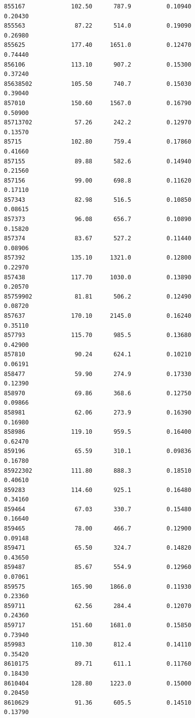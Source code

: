 \documentclass[
  letterpaper,
  DIV=11,
  numbers=noendperiod]{scrartcl}
\begin{document}
\begin{verbatim}
855167             102.50      787.9          0.10940           0.20430
855563              87.22      514.0          0.19090           0.26980
855625             177.40     1651.0          0.12470           0.74440
856106             113.10      907.2          0.15300           0.37240
85638502           105.50      740.7          0.15030           0.39040
857010             150.60     1567.0          0.16790           0.50900
85713702            57.26      242.2          0.12970           0.13570
85715              102.80      759.4          0.17860           0.41660
857155              89.88      582.6          0.14940           0.21560
857156              99.00      698.8          0.11620           0.17110
857343              82.98      516.5          0.10850           0.08615
857373              96.08      656.7          0.10890           0.15820
857374              83.67      527.2          0.11440           0.08906
857392             135.10     1321.0          0.12800           0.22970
857438             117.70     1030.0          0.13890           0.20570
85759902            81.81      506.2          0.12490           0.08720
857637             170.10     2145.0          0.16240           0.35110
857793             115.70      985.5          0.13680           0.42900
857810              90.24      624.1          0.10210           0.06191
858477              59.90      274.9          0.17330           0.12390
858970              69.86      368.6          0.12750           0.09866
858981              62.06      273.9          0.16390           0.16980
858986             119.10      959.5          0.16400           0.62470
859196              65.59      310.1          0.09836           0.16780
85922302           111.80      888.3          0.18510           0.40610
859283             114.60      925.1          0.16480           0.34160
859464              67.03      330.7          0.15480           0.16640
859465              78.00      466.7          0.12900           0.09148
859471              65.50      324.7          0.14820           0.43650
859487              85.67      554.9          0.12960           0.07061
859575             165.90     1866.0          0.11930           0.23360
859711              62.56      284.4          0.12070           0.24360
859717             151.60     1681.0          0.15850           0.73940
859983             110.30      812.4          0.14110           0.35420
8610175             89.71      611.1          0.11760           0.18430
8610404            128.80     1223.0          0.15000           0.20450
8610629             91.36      605.5          0.14510           0.13790

\end{verbatim}
\end{document}
